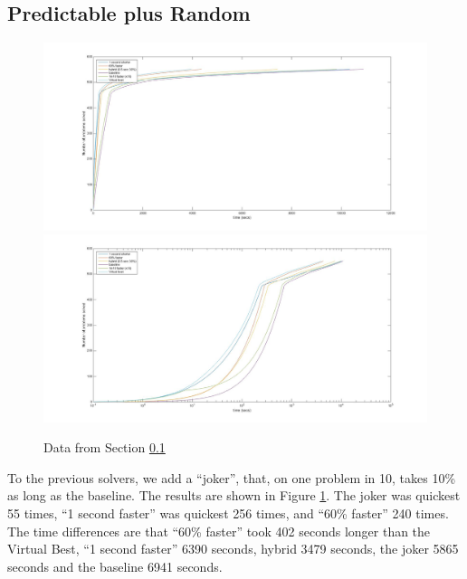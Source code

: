 \documentclass{easychair}
\begin{document}
\subsection{Predictable plus Random}\label{sec:P+J}
\begin{figure}[h]
\caption{Data from Section \ref{sec:P+J}\label{Fig:S4}}
\includegraphics[scale=0.25]{Fig4a.jpg}
\includegraphics[scale=0.25]{Fig4b.jpg}
\end{figure}
To the previous solvers, we add a ``joker'', that, on one problem in 10, takes 10\% as long as the baseline.  The results are shown in Figure \ref{Fig:S4}. The joker was quickest 55 times, ``1 second faster'' was quickest 256 times, and ``60\% faster'' 240 times. The time differences are that ``60\% faster'' took 402 seconds longer than the Virtual Best, ``1 second faster''  6390 seconds, hybrid 3479 seconds, the joker 5865 seconds and the baseline 6941 seconds.
\end{document}
